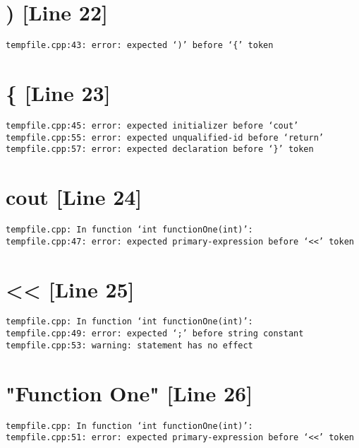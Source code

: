 \documentclass{article}
\begin{document}
\section{) [Line 22]}
\begin{verbatim}
tempfile.cpp:43: error: expected ‘)’ before ‘{’ token

\end{verbatim}



\section{\{ [Line 23]}
\begin{verbatim}
tempfile.cpp:45: error: expected initializer before ‘cout’
tempfile.cpp:55: error: expected unqualified-id before ‘return’
tempfile.cpp:57: error: expected declaration before ‘}’ token

\end{verbatim}



\section{cout [Line 24]}
\begin{verbatim}
tempfile.cpp: In function ‘int functionOne(int)’:
tempfile.cpp:47: error: expected primary-expression before ‘<<’ token

\end{verbatim}



\section{<< [Line 25]}
\begin{verbatim}
tempfile.cpp: In function ‘int functionOne(int)’:
tempfile.cpp:49: error: expected ‘;’ before string constant
tempfile.cpp:53: warning: statement has no effect

\end{verbatim}



\section{"Function One" [Line 26]}
\begin{verbatim}
tempfile.cpp: In function ‘int functionOne(int)’:
tempfile.cpp:51: error: expected primary-expression before ‘<<’ token

\end{verbatim}
\end{document}
